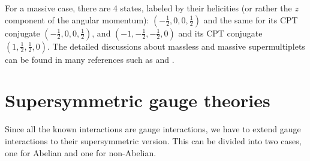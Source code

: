 \documentclass[12pt]{report}
\begin{document}
For a massive case, there are 4 states, labeled by their helicities (or rather the $z$ component of the angular momentum): $(-\frac{1}{2}, 0, 0, \frac{1}{2})$ and the same for its CPT conjugate $(-\frac{1}{2}, 0, 0, \frac{1}{2})$, and $(-1, -\frac{1}{2}, -\frac{1}{2}, 0)$ and its CPT conjugate $(1, \frac{1}{2}, \frac{1}{2}, 0)$.
The detailed discussions about massless and massive supermultiplets can be found in many references such as \cite{Bilal} and \cite{larsenf}.





\chapter{Supersymmetric gauge theories} \label{app: supersymmetric_gauge_theories}

Since all the known interactions are gauge interactions, we have to extend gauge interactions to their supersymmetric version.
This can be divided into two cases, one for Abelian and one for non-Abelian.
\end{document}
